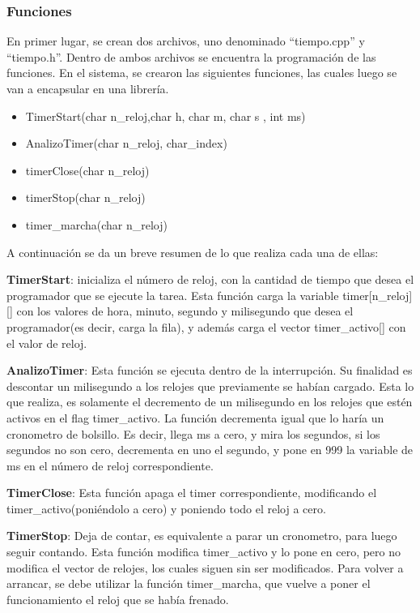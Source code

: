 \subsubsection{Funciones}

En primer lugar, se crean dos archivos, uno denominado ``tiempo.cpp''  y ``tiempo.h''. Dentro de ambos archivos se encuentra la programación de las funciones. En el sistema, se crearon las siguientes funciones, las cuales luego se van a encapsular en una librería.  

\begin{itemize}
\item TimerStart(char n\_reloj,char h, char m, char s , int ms)
\item AnalizoTimer(char n\_reloj, char\_index) 
\item timerClose(char n\_reloj) 
\item timerStop(char n\_reloj)
\item timer\_marcha(char n\_reloj) 
\end{itemize}

A continuación se da un breve resumen de lo que realiza cada una de ellas: 

\textbf{TimerStart}:  inicializa el número de reloj, con la cantidad de tiempo que desea el programador que se ejecute la tarea. Esta función carga la variable timer[n\_reloj][] con los valores de hora, minuto, segundo y milisegundo que desea el programador(es decir, carga la fila), y además carga el vector timer\_activo[] con el valor de reloj. 

\textbf{AnalizoTimer}: Esta función se ejecuta dentro de la interrupción. Su finalidad es descontar un milisegundo a los relojes que previamente se habían cargado. Esta lo que realiza, es solamente el decremento de un milisegundo en los relojes que estén activos en el flag timer\_activo. La función decrementa igual que lo haría un cronometro de bolsillo. Es decir, llega ms a cero, y mira los segundos, si los segundos no son cero, decrementa en uno el segundo, y pone en 999 la variable de ms en el número de reloj correspondiente.  

\textbf{TimerClose}: Esta función apaga el timer correspondiente, modificando el timer\_activo(poniéndolo a cero) y poniendo todo el reloj a cero. 

\textbf{TimerStop}: Deja de contar, es equivalente a parar un cronometro, para luego seguir contando. Esta función modifica timer\_activo y lo pone en cero, pero no modifica el vector de relojes, los cuales siguen sin ser modificados. Para volver a arrancar, se debe utilizar la función timer\_marcha, que vuelve a poner el funcionamiento el reloj que se había frenado. 

